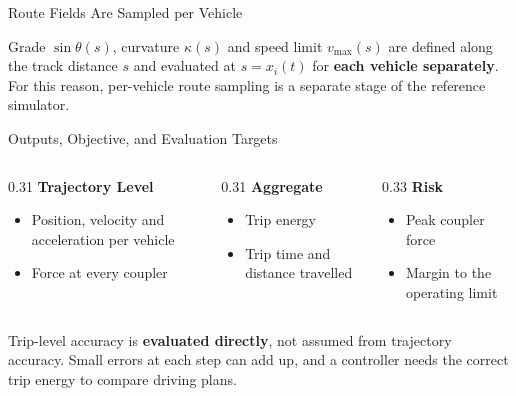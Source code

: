 \begin{frame}{Route Fields Are Sampled per Vehicle}
  \vspace{0.6em}
  \centering
  \scalebox{0.72}{\consistOnGrade}

  \vspace{1.0em}
  \begin{minipage}{0.88\textwidth}\small
    Grade $\sin\theta(s)$, curvature $\kappa(s)$ and speed limit $v_{\max}(s)$ are
    defined along the track distance $s$ and evaluated at $s = x_i(t)$ for
    \textbf{each vehicle separately}. For this reason, per-vehicle route sampling
    is a separate stage of the reference simulator.
  \end{minipage}
\end{frame}

\begin{frame}{Outputs, Objective, and Evaluation Targets}
  \vspace{0.5em}
  \begin{columns}[T,onlytextwidth]
    \begin{column}{0.31\textwidth}
      {\small\textbf{Trajectory Level}}
      \begin{itemize}\setlength\itemsep{0.3em}
        \item[] {\footnotesize Position, velocity and acceleration per vehicle}
        \item[] {\footnotesize Force at every coupler}
      \end{itemize}
    \end{column}
    \begin{column}{0.31\textwidth}
      {\small\textbf{Aggregate}}
      \begin{itemize}\setlength\itemsep{0.3em}
        \item[] {\footnotesize Trip energy}
        \item[] {\footnotesize Trip time and distance travelled}
      \end{itemize}
    \end{column}
    \begin{column}{0.33\textwidth}
      {\small\textbf{Risk}}
      \begin{itemize}\setlength\itemsep{0.3em}
        \item[] {\footnotesize Peak coupler force}
        \item[] {\footnotesize Margin to the operating limit}
      \end{itemize}
    \end{column}
  \end{columns}

  \vspace{1.3em}
  \begin{minipage}{0.92\textwidth}\small
    Trip-level accuracy is \textbf{evaluated directly}, not assumed from
    trajectory accuracy. Small errors at each step can add up, and a controller
    needs the correct trip energy to compare driving plans.
  \end{minipage}
\end{frame}

